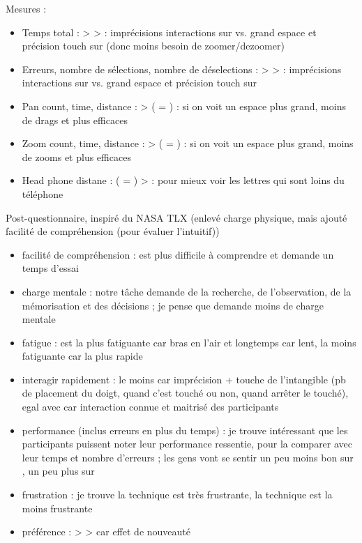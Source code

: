 Mesures :
\begin{itemize}
  \item Temps total :  >  >  : imprécisions interactions sur  vs. grand espace et précision touch sur  (donc moins besoin de zoomer/dezoomer)
  \item Erreurs, nombre de sélections, nombre de déselections :  >  >  : imprécisions interactions sur  vs. grand espace et précision touch sur 
  \item Pan count, time, distance :  > ( = ) : si on voit un espace plus grand, moins de drags et plus efficaces
  \item Zoom count, time, distance :  > ( = ) : si on voit un espace plus grand, moins de zooms et plus efficaces
  \item Head phone distane : ( = ) >  : pour mieux voir les lettres qui sont loins du téléphone
\end{itemize}

Post-questionnaire, inspiré du NASA TLX (enlevé charge physique, mais ajouté facilité de compréhension (pour évaluer l'intuitif))
\begin{itemize}
  \item facilité de compréhension :  est plus difficile à comprendre et demande un temps d'essai
  \item charge mentale : notre tâche demande de la recherche, de l'observation, de la mémorisation et des décisions ; je pense que  demande moins de charge mentale
  \item fatigue :  est la plus fatiguante car bras en l'air et longtemps car lent,  la moins fatiguante car la plus rapide
  \item interagir rapidement :  le moins car imprécision + touche de l'intangible (pb de placement du doigt, quand c'est touché ou non, quand arrêter le touché),  egal avec  car interaction connue et maitrisé des participants
  \item performance (inclus erreurs en plus du temps) : je trouve intéressant que les participants puissent noter leur performance ressentie, pour la comparer avec leur temps et nombre d'erreurs ; les gens vont se sentir un peu moins bon sur , un peu plus sur 
  \item frustration : je trouve la technique  est très frustrante, la technique  est la moins frustrante
  \item préférence :  >  >  car effet de nouveauté
\end{itemize}


